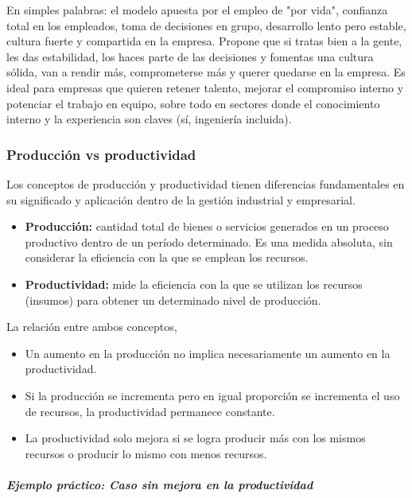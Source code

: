 \documentclass[a4paper,oneside,11pt]{article}
\begin{document}
En simples palabras: el modelo apuesta por el empleo de "por vida", confianza total en los empleados, toma de decisiones en grupo, desarrollo lento pero estable, cultura fuerte y compartida en la empresa. Propone que si tratas bien a la gente, les das estabilidad, los haces parte de las decisiones y fomentas una cultura sólida, van a rendir más, comprometerse más y querer quedarse en la empresa. Es ideal para empresas que quieren retener talento, mejorar el compromiso interno y potenciar el trabajo en equipo, sobre todo en sectores donde el conocimiento interno y la experiencia son claves (sí, ingeniería incluida).

\subsubsection{Producción vs productividad}

Los conceptos de producción y productividad tienen diferencias fundamentales en su significado y aplicación dentro de la gestión industrial y empresarial.

\begin{itemize}
    \item \textbf{Producción:} cantidad total de bienes o servicios generados en un proceso productivo dentro de un período determinado. Es una medida absoluta, sin considerar la eficiencia con la que se emplean los recursos.

    \item \textbf{Productividad:} mide la eficiencia con la que se utilizan los recursos (insumos) para obtener un determinado nivel de producción.
\end{itemize}

La relación entre ambos conceptos,

\begin{itemize}
    \item Un aumento en la producción no implica necesariamente un aumento en la productividad.
    \item Si la producción se incrementa pero en igual proporción se incrementa el uso de recursos, la productividad permanece constante.
    \item La productividad solo mejora si se logra producir más con los mismos recursos o producir lo mismo con menos recursos.
\end{itemize}

\paragraph{\textit{Ejemplo práctico: Caso sin mejora en la productividad}}
\end{document}
